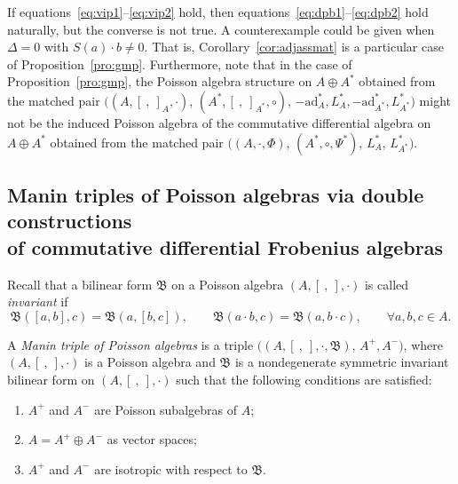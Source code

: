 \documentclass[10pt,a4paper]{amsart}
\numberwithin{equation}{section}
\newcommand{\ad}{\mathrm{ad}}
\begin{document}
\begin{Remark}
 If equations~\eqref{eq:vip1}--\eqref{eq:vip2} hold,
 then equations~\eqref{eq:dpb1}--\eqref{eq:dpb2} hold naturally, but the converse is not true.
 A counterexample could be given when $\Delta = 0$ with $S(a) \cdot b \neq 0$.
 That is, Corollary~\ref{cor:adjassmat} is a particular case of Proposition~\ref{pro:gmp}.
 Furthermore, note that in the case of Proposition~\ref{pro:gmp},
 the Poisson algebra structure on $A \oplus A^*$ obtained from the matched pair $((A, [\ ,\ ]_A, \cdot)$, $(A^*, [\ ,\ ]_{A^*}, \circ)$, $-\ad_A^*, L_A^*, -\ad_{A^*}^*, L_{A^*}^*)$ might not be
 the induced Poisson algebra of the commutative differential algebra on $A \oplus A^*$ obtained from the matched pair $((A, \cdot, \Phi)$, $(A^*, \circ, \Psi^*)$, $L_{A}^*$, $L_{A^*}^*)$.
\end{Remark}

\subsection[Manin triples of Poisson algebras via double constructions of commutative differential Frobenius algebras]{Manin triples of Poisson algebras via double constructions\\ of commutative differential Frobenius algebras}

Recall that a bilinear form $\mathfrak B$ on a Poisson algebra $(A, [\ ,\ ], \cdot)$ is called \textit{invariant} if
\begin{equation*}
	\mathfrak{B}([a, b], c) = \mathfrak{B}(a, [b, c]), \qquad \mathfrak{B}(a \cdot b, c) = \mathfrak{B}(a, b \cdot c), \qquad \forall a, b, c \in A.
\end{equation*}

\begin{Definition}
 A \textit{Manin triple of Poisson algebras} is a triple $((A, [\ ,\ ], \cdot, \mathfrak{B})$, $A^{+},
 A^{-})$,
 where $(A, [\ ,\ ], \cdot)$ is a Poisson algebra and $\mathfrak{B}$ is a nondegenerate symmetric invariant bilinear form on $(A, [\ ,\ ], \cdot)$ such that the following conditions are satisfied:
 \begin{enumerate}\itemsep=0pt
 \item[(1)] $A^{+}$ and $A^{-}$ are Poisson subalgebras of $A$;
 \item[(2)] $A = A^{+} \oplus A^{-}$ as vector spaces;
 \item[(3)]$A^{+}$ and $A^{-}$ are isotropic with respect to $\mathfrak{B}$.
 \end{enumerate}
\end{Definition}
\end{document}
